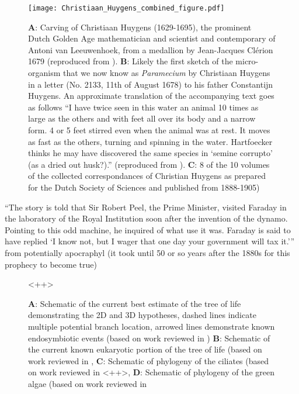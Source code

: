 \begin{figure}[h!]
    \caption{\textbf{A}: Carving of Christiaan Huygens (1629-1695), the prominent Dutch Golden Age mathematician and scientist and contemporary of Antoni van Leeuwenhoek, from a medallion by Jean-Jacques Cl\'erion 1679 (reproduced from \citep{Huygens}). \textbf{B}: Likely the first sketch of the micro-organism that we now know as \textit{Paramecium} by Christiaan Huygens in a letter (No. 2133, 11th of August 1678) to his father Constantijn Huygens. An approximate translation of the accompanying text goes as follows ``I have twice seen in this water an animal 10 times as large as the others and with feet all over its body and a narrow form. 4 or 5 feet stirred even when the animal was at rest. It moves as fast as the others, turning and spinning in the water. Hartfoecker thinks he may have discovered the same species in `semine corrupto' (as a dried out husk?).'' (reproduced from \citep{Huygens}). \textbf{C}: 8 of the 10 volumes of the collected correspondances of Christian Huygens as prepared for the Dutch Society of Sciences and published from 1888-1905)}
\texttt{[image: Christiaan\_Huygens\_combined\_figure.pdf]}
\end{figure}



``The story is told that Sir Robert Peel, the Prime Minister, visited Faraday in the laboratory of the Royal Institution soon after the invention of the dynamo.
Pointing to this odd machine, he inquired of what use it was. Faraday is said to have replied `I know not, but I wager that one day your government will tax it.'''
from \citep{PearceWilliams1965} potentially apocraphyl (it took until 50 or so years after the 1880s for this prophecy to become true)


\begin{figure}
    \caption{\textbf{A}: Schematic of the current best estimate of the tree of life demonstrating the 2D and 3D hypotheses,
dashed lines indicate multiple potential branch location, arrowed lines demonstrate known endosymbiotic events (based on work reviewed in \citep{Gribaldo2010})
\textbf{B}: Schematic of the current known eukaryotic portion of the tree of life (based on work reviewed in \citep{Burki2014},
\textbf{C}: Schematic of phylogeny of the ciliates (based on work reviewed in \citep{}<++>,
\textbf{D}: Schematic of phylogeny of the green algae (based on work reviewed in \citep{Leliaert2012}}
    <++>
\end{figure}

